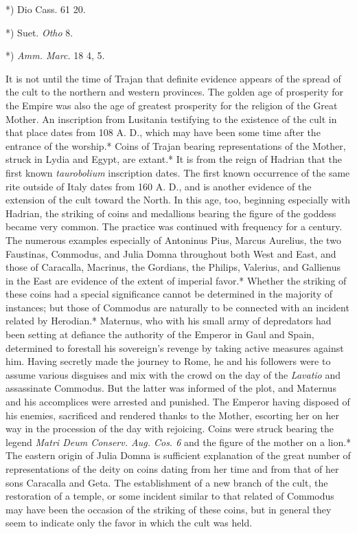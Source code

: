 \documentclass[a4paper, 11pt, oneside, polutonikogreek, english]{article}
\begin{document}
*) Dio Cass. 61 20.

*) Suet. \emph{Otho} 8.

*) \emph{Amm. Marc.} 18 4, 5.

It is not until the time of Trajan that definite evidence appears of the spread of the cult to the northern and western provinces. The golden age of prosperity for the Empire was also the age of greatest prosperity for the religion of the Great Mother. An inscription from Lusitania testifying to the existence of the cult in that place dates from 108 A. D., which may have been some time after the entrance of the worship.* Coins of Trajan bearing representations of the Mother, struck in Lydia and Egypt, are extant.* It is from the reign of Hadrian that the first known \emph{taurobolium} inscription dates. The first known occurrence of the same rite outside of Italy dates from 160 A. D., and is another evidence of the extension of the cult toward the North. In this age, too, beginning especially with Hadrian, the striking of coins and medallions bearing the figure of the goddess became very common. The practice was continued with frequency for a century. The numerous examples especially of Antoninus Pius, Marcus Aurelius, the two Faustinas, Commodus, and Julia Domna throughout both West and East, and those of Caracalla, Macrinus, the Gordians, the Philips, Valerius, and Gallienus in the East are evidence of the extent of imperial favor.* Whether the striking of these coins had a special significance cannot be determined in the majority of instances; but those of Commodus are naturally to be connected with an incident related by Herodian.* Maternus, who with his small army of depredators had been setting at defiance the authority of the Emperor in Gaul and Spain, determined to forestall his sovereign's revenge by taking active measures against him. Having secretly made the journey to Rome, he and his followers were to assume various disguises and mix with the crowd on the day of the \emph{Lavatio} and assassinate Commodus. But the latter was informed of the plot, and Maternus and his accomplices were arrested and punished. The Emperor having disposed of his enemies, sacrificed and rendered thanks to the Mother, escorting her on her way in the procession of the day with rejoicing. Coins were struck bearing the legend \emph{Matri Deum Conserv. Aug. Cos. 6} and the figure of the mother on a lion.* The eastern origin of Julia Domna is sufficient explanation of the great number of representations of the deity on coins dating from her time and from that of her sons Caracalla and Geta. The establishment of a new branch of the cult, the restoration of a temple, or some incident similar to that related of Commodus may have been the occasion of the striking of these coins, but in general they seem to indicate only the favor in which the cult was held.
\end{document}
